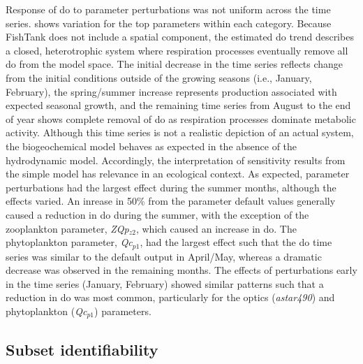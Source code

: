\documentclass[letterpaper,12pt,oneside]{article}\usepackage[]{graphicx}\usepackage[]{color}
\begin{document}
Response of \ac{do} to parameter perturbations was not uniform across the time series.   shows variation for the top parameters within each category.  Because FishTank does not include a spatial component, the estimated \ac{do} trend describes a closed, heterotrophic system where respiration processes eventually remove all \ac{do} from the model space.  The initial decrease in the time series reflects change from the initial conditions outside of the growing seasons (i.e., January, February), the spring/summer increase represents production associated with expected seasonal growth, and the remaining time series from August to the end of year shows complete removal of \ac{do} as respiration processes dominate metabolic activity. Although this time series is not a realistic depiction of an actual system, the biogeochemical model behaves as expected in the absence of the hydrodynamic model.  Accordingly, the interpretation of sensitivity results from the simple model has relevance in an ecological context.  As expected, parameter perturbations had the largest effect during the summer months, although the effects varied.  An inrease in 50\% from the parameter default values generally caused a reduction in \ac{do} during the summer, with the exception of the zooplankton parameter, \textit{ZQp$_{z2}$}, which caused an increase in \ac{do}.  The phytoplankton parameter, \textit{Qc$_{p1}$}, had the largest effect such that the \ac{do} time series was similar to the default output in April/May, whereas a dramatic decrease was observed in the remaining months.  The effects of perturbations early in the time series (January, February) showed similar patterns such that a reduction in \ac{do} was most common, particularly for the optics (\textit{astar490}) and phytoplankton (\textit{Qc$_{p1}$}) parameters.

\subsection{Subset identifiability}
\end{document}
